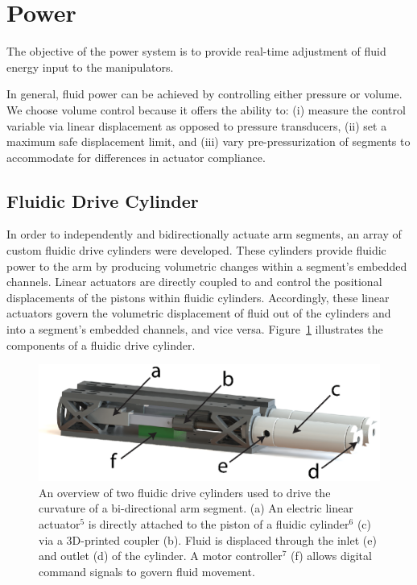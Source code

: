 \section{Power}
\label{sec:Power}
The objective of the power system is to provide real-time adjustment of fluid energy input to the manipulators.


In general, fluid power can be achieved by controlling either pressure or volume.
We choose volume control because it offers the ability to: (i) measure the control variable via linear displacement as opposed to pressure transducers, (ii) set a maximum safe displacement limit, and (iii) vary pre-pressurization of segments to accommodate for differences in actuator compliance.

\subsection{Fluidic Drive Cylinder}
\label{subsec:Power, FDC}
In order to independently and bidirectionally actuate arm segments, an array of custom fluidic drive cylinders were developed.
These cylinders provide fluidic power to the arm by producing volumetric changes within a segment's embedded channels.
Linear actuators are directly coupled to and control the positional displacements of the pistons within fluidic cylinders.
Accordingly, these linear actuators govern the volumetric displacement of fluid out of the cylinders and into a segment's embedded channels, and vice versa.
Figure~\ref{fig:DriveCylinderOverview} illustrates the components of a fluidic drive cylinder.
\begin{figure}[thb]
\centering
   \includegraphics[width=\columnwidth]{Figures/power/DriveCylinderOverview.eps}
   \caption[An overview of the fluidic drive cylinders.]{An overview of two fluidic drive cylinders used to drive the curvature of a bi-directional arm segment. (a) An electric linear actuator$^5$ is directly attached to the piston of a fluidic cylinder$^6$ (c) via a 3D-printed coupler (b). Fluid is displaced through the inlet (e) and outlet (d) of the cylinder. A motor controller$^7$ (f) allows digital command signals to govern fluid movement.}
   \label{fig:DriveCylinderOverview}
\end{figure}

